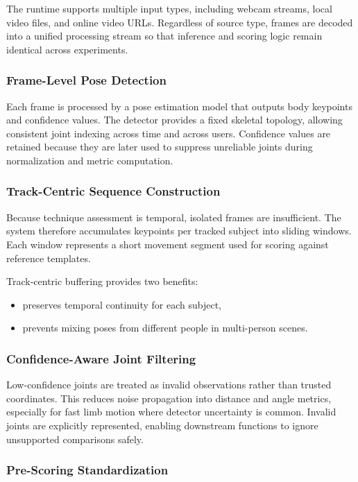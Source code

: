 \documentclass[12pt]{article}
\begin{document}
{The runtime supports multiple input types, including webcam streams, local video files, and online video URLs. Regardless of source type, frames are decoded into a unified processing stream so that inference and scoring logic remain identical across experiments.

\subsubsection{Frame-Level Pose Detection}

Each frame is processed by a pose estimation model that outputs body keypoints and confidence values. The detector provides a fixed skeletal topology, allowing consistent joint indexing across time and across users. Confidence values are retained because they are later used to suppress unreliable joints during normalization and metric computation.

\subsubsection{Track-Centric Sequence Construction}

Because technique assessment is temporal, isolated frames are insufficient. The system therefore accumulates keypoints per tracked subject into sliding windows. Each window represents a short movement segment used for scoring against reference templates.

Track-centric buffering provides two benefits:

\begin{itemize}
    \item preserves temporal continuity for each subject,
    \item prevents mixing poses from different people in multi-person scenes.
\end{itemize}

\subsubsection{Confidence-Aware Joint Filtering}

Low-confidence joints are treated as invalid observations rather than trusted coordinates. This reduces noise propagation into distance and angle metrics, especially for fast limb motion where detector uncertainty is common. Invalid joints are explicitly represented, enabling downstream functions to ignore unsupported comparisons safely.

\subsubsection{Pre-Scoring Standardization}

}
\end{document}
